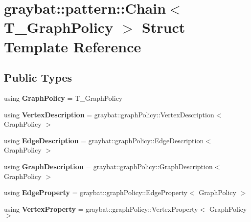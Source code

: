 \hypertarget{structgraybat_1_1pattern_1_1Chain}{}\section{graybat\+:\+:pattern\+:\+:Chain$<$ T\+\_\+\+Graph\+Policy $>$ Struct Template Reference}
\label{structgraybat_1_1pattern_1_1Chain}
\subsection*{Public Types}
\begin{DoxyCompactItemize}
\item 
\hypertarget{structgraybat_1_1pattern_1_1Chain_a9ca3386b63d3eb534a312967f2f17ae1}{}using {\bfseries Graph\+Policy} = T\+\_\+\+Graph\+Policy\label{structgraybat_1_1pattern_1_1Chain_a9ca3386b63d3eb534a312967f2f17ae1}

\item 
\hypertarget{structgraybat_1_1pattern_1_1Chain_aea7eb3641cc1df611928bf23a30fcf68}{}using {\bfseries Vertex\+Description} = graybat\+::graph\+Policy\+::\+Vertex\+Description$<$ Graph\+Policy $>$\label{structgraybat_1_1pattern_1_1Chain_aea7eb3641cc1df611928bf23a30fcf68}

\item 
\hypertarget{structgraybat_1_1pattern_1_1Chain_a6f871353276d8a35ca3910595340c658}{}using {\bfseries Edge\+Description} = graybat\+::graph\+Policy\+::\+Edge\+Description$<$ Graph\+Policy $>$\label{structgraybat_1_1pattern_1_1Chain_a6f871353276d8a35ca3910595340c658}

\item 
\hypertarget{structgraybat_1_1pattern_1_1Chain_a6becc624fc5d680ca82634d4823344a6}{}using {\bfseries Graph\+Description} = graybat\+::graph\+Policy\+::\+Graph\+Description$<$ Graph\+Policy $>$\label{structgraybat_1_1pattern_1_1Chain_a6becc624fc5d680ca82634d4823344a6}

\item 
\hypertarget{structgraybat_1_1pattern_1_1Chain_afa9983e560aca9dcc8f8e54ad6cd0ab4}{}using {\bfseries Edge\+Property} = graybat\+::graph\+Policy\+::\+Edge\+Property$<$ Graph\+Policy $>$\label{structgraybat_1_1pattern_1_1Chain_afa9983e560aca9dcc8f8e54ad6cd0ab4}

\item 
\hypertarget{structgraybat_1_1pattern_1_1Chain_a912816f3b3b7836d60d38c562c0d6401}{}using {\bfseries Vertex\+Property} = graybat\+::graph\+Policy\+::\+Vertex\+Property$<$ Graph\+Policy $>$\label{structgraybat_1_1pattern_1_1Chain_a912816f3b3b7836d60d38c562c0d6401}

\end{DoxyCompactItemize}
